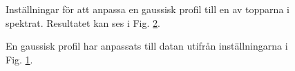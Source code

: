 \documentclass[11pt,swedish,a4paper]{article}
\begin{document}
\begin{figure}[h!]
  \centering
  \caption{Inställningar för att anpassa en gaussisk profil
	  till en av topparna i spektrat. Resultatet kan ses i Fig. 
  \ref{fig:fittedgaussian}.} \label{fig:fitpars}
\end{figure}

\begin{figure}[h!]
  \centering
  \caption{En gaussisk profil har anpassats till datan
	  utifrån inställningarna i Fig. 
  \ref{fig:fitpars}.} \label{fig:fittedgaussian}
\end{figure}
\end{document}

